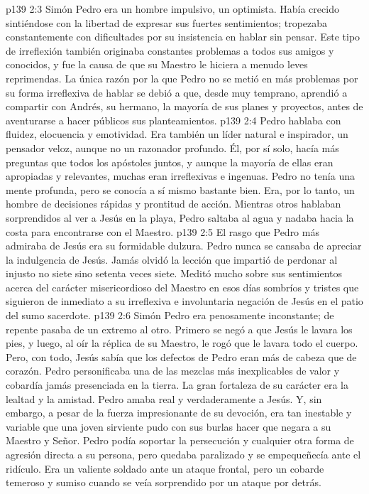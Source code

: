 \vs p139 2:3 \pc Simón Pedro era un hombre impulsivo, un optimista. Había crecido sintiéndose con la libertad de expresar sus fuertes sentimientos; tropezaba constantemente con dificultades por su insistencia en hablar sin pensar. Este tipo de irreflexión también originaba constantes problemas a todos sus amigos y conocidos, y fue la causa de que su Maestro le hiciera a menudo leves reprimendas. La única razón por la que Pedro no se metió en más problemas por su forma irreflexiva de hablar se debió a que, desde muy temprano, aprendió a compartir con Andrés, su hermano, la mayoría de sus planes y proyectos, antes de aventurarse a hacer públicos sus planteamientos.
\vs p139 2:4 Pedro hablaba con fluidez, elocuencia y emotividad. Era también un líder natural e inspirador, un pensador veloz, aunque no un razonador profundo. Él, por sí solo, hacía más preguntas que todos los apóstoles juntos, y aunque la mayoría de ellas eran apropiadas y relevantes, muchas eran irreflexivas e ingenuas. Pedro no tenía una mente profunda, pero se conocía a sí mismo bastante bien. Era, por lo tanto, un hombre de decisiones rápidas y prontitud de acción. Mientras otros hablaban sorprendidos al ver a Jesús en la playa, Pedro saltaba al agua y nadaba hacia la costa para encontrarse con el Maestro.
\vs p139 2:5 \pc El rasgo que Pedro más admiraba de Jesús era su formidable dulzura. Pedro nunca se cansaba de apreciar la indulgencia de Jesús. Jamás olvidó la lección que impartió de perdonar al injusto no siete sino setenta veces siete. Meditó mucho sobre sus sentimientos acerca del carácter misericordioso del Maestro en esos días sombríos y tristes que siguieron de inmediato a su irreflexiva e involuntaria negación de Jesús en el patio del sumo sacerdote.
\vs p139 2:6 \pc Simón Pedro era penosamente inconstante; de repente pasaba de un extremo al otro. Primero se negó a que Jesús le lavara los pies, y luego, al oír la réplica de su Maestro, le rogó que le lavara todo el cuerpo. Pero, con todo, Jesús sabía que los defectos de Pedro eran más de cabeza que de corazón. Pedro personificaba una de las mezclas más inexplicables de valor y cobardía jamás presenciada en la tierra. La gran fortaleza de su carácter era la lealtad y la amistad. Pedro amaba real y verdaderamente a Jesús. Y, sin embargo, a pesar de la fuerza impresionante de su devoción, era tan inestable y variable que una joven sirviente pudo con sus burlas hacer que negara a su Maestro y Señor. Pedro podía soportar la persecución y cualquier otra forma de agresión directa a su persona, pero quedaba paralizado y se empequeñecía ante el ridículo. Era un valiente soldado ante un ataque frontal, pero un cobarde temeroso y sumiso cuando se veía sorprendido por un ataque por detrás.
